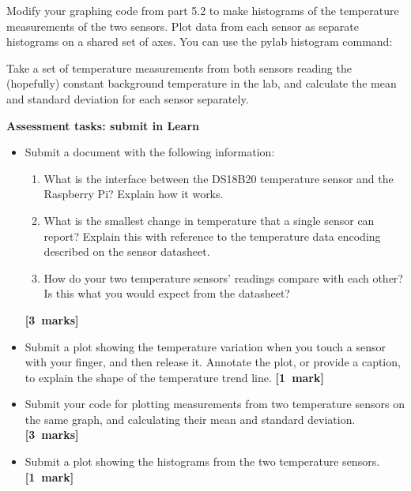 \begin{enumerate}
\newpage

Modify your graphing code from part 5.2 to make histograms of the temperature measurements of the two sensors.
Plot data from each sensor as separate histograms on a shared set of axes.
You can use the pylab histogram command:



Take a set of temperature measurements from both sensors reading the (hopefully) constant background temperature in the lab, and calculate the mean and standard deviation for each sensor separately.


\end{enumerate}

{\bf Assessment tasks: submit in Learn}

\begin{itemize}

\item Submit a document with the following information:
\begin{enumerate}
\item What is the interface between the DS18B20 temperature sensor and the Raspberry Pi?
Explain how it works.
\item What is the smallest change in temperature that a single sensor can report?
Explain this with reference to the temperature data encoding described on the sensor datasheet.
\item How do your two temperature sensors' readings compare with each other?
Is this what you would expect from the datasheet?
\end{enumerate}
\hfill {\bf[3~marks]}

\item Submit a plot showing the temperature variation when you touch a sensor with your finger, and then release it.
Annotate the plot, or provide a caption, to explain the shape of the temperature trend line.
\null\hfill {\bf[1~mark]}

\item Submit your code for plotting measurements from two temperature sensors on the same graph, and calculating their mean and standard deviation.
\null\hfill {\bf[3~marks]}

\item Submit a plot showing the histograms from the two temperature sensors.
\null\hfill {\bf[1~mark]}

\end{itemize}


